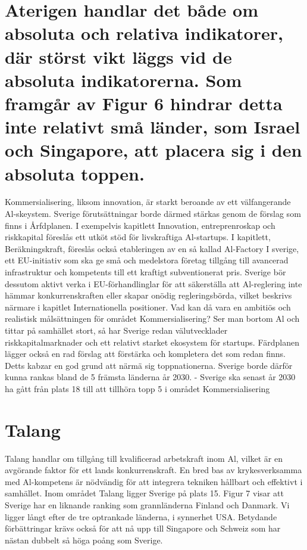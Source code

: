 {{{{{\section*{Aterigen handlar det både om absoluta och relativa indikatorer, där störst vikt läggs vid de absoluta indikatorerna. Som framgår av Figur 6 hindrar detta inte relativt små länder, som Israel och Singapore, att placera sig i den absoluta toppen.}
Kommersialisering, liksom innovation, är starkt beroande av ett välfangerande Al-skeystem. Sverige förutsättningar borde därmed stärkas genom de förslag som finns i Årfdplanen. I exempelvis kapitlett Innovation, entreprenroskap och riskkapital föreslås ett utköt stöd för livskraftiga Al-startups. I kapitlett, Beräkningskraft, föreslås också etableringen av en så kallad Al-Factory I sverige, ett EU-initiativ som ska ge små och medelstora företag tillgång till avancerad infrastruktur och kompetents till ett kraftigt subventionerat pris. Sverige bör dessutom aktivt verka i EU-förhandlinglar för att säkerställa att Al-reglering inte hämmar konkurrenskraften eller skapar onödig regleringsbörda, vilket beskrivs närmare i kapitlet Internationella positioner.
Vad kan då vara en ambitiös och realistisk målsättningen för området Kommersialisering? Ser man bortom Al och tittar på samhället stort, så har Sverige redan välutvecklader riskkapitalmarknader och ett relativt starket ekosystem för startups. Färdplanen lägger också en rad förslag att förstärka och kompletera det som redan finns. Detts kabzar en god grund att närmä sig toppnationerna. Sverige borde därför kunna rankas bland de 5 främsta länderna år 2030.
- Sverige ska senast år 2030 ha gått från plats 18 till att tillhöra topp 5 i området Kommersialisering
\section*{Talang}
Talang handlar om tillgång till kvalificerad arbetskraft inom Al, vilket är en avgörande faktor för ett lands konkurrenskraft. En bred bas av krykesverksamma med Al-kompetens är nödvändig för att integrera tekniken hållbart och effektivt i samhället. Inom området Talang ligger Sverige på plats 15.
Figur 7 visar att Sverige har en liknande ranking som grannländerna Finland och Danmark. Vi ligger långt efter de tre optrankade länderna, i synnerhet USA. Betydande förbättringar krävs också för att nå upp till Singapore och Schweiz som har nästan dubbelt så höga poång som Sverige.

}}}}}
